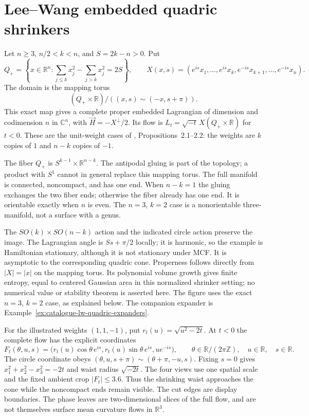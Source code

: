 \chapter{Lee--Wang embedded quadric shrinkers}\label{sec:catalogue-lw-quadric-shrinkers}
\begin{example}\label{ex:catalogue-lw-quadric-shrinkers}
Let $n\geq3$, $n/2<k<n$, and $S=2k-n>0$. Put
\[
 Q_+=\left\{x\in\mathbb R^n:\sum_{j\leq k}x_j^2-\sum_{j>k}x_j^2=2S\right\},\qquad
 X(x,s)=(e^{is}x_1,\ldots,e^{is}x_k,e^{-is}x_{k+1},\ldots,e^{-is}x_n).
\]
The domain is the mapping torus
\[
 (Q_+\times\mathbb R)/((x,s)\sim(-x,s+\pi)).
\]
This exact map gives a complete proper embedded Lagrangian of dimension and codimension $n$ in $\mathbb C^n$, with $\vec H=-X^\perp/2$. Its flow is $L_t=\sqrt{-t}\,X(Q_+\times\mathbb R)$ for $t<0$. These are the unit-weight cases of \cite{CatLeeWang2010}, Propositions~2.1--2.2: the weights are $k$ copies of $1$ and $n-k$ copies of $-1$.

The fiber $Q_+$ is $S^{k-1}\times\mathbb R^{n-k}$. The antipodal gluing is part of the topology; a product with $S^1$ cannot in general replace this mapping torus. The full manifold is connected, noncompact, and has one end. When $n-k=1$ the gluing exchanges the two fiber ends; otherwise the fiber already has one end. It is orientable exactly when $n$ is even. The $n=3$, $k=2$ case is a nonorientable three-manifold, not a surface with a genus.

The $SO(k)\times SO(n-k)$ action and the indicated circle action preserve the image. The Lagrangian angle is $Ss+\pi/2$ locally; it is harmonic, so the example is Hamiltonian stationary, although it is not stationary under MCF. It is asymptotic to the corresponding quadric cone. Properness follows directly from $|X|=|x|$ on the mapping torus. Its polynomial volume growth gives finite entropy, equal to centered Gaussian area in this normalized shrinker setting; no numerical value or stability theorem is asserted here. The figure uses the exact $n=3$, $k=2$ case, as explained below. The companion expander is Example~\ref{ex:catalogue-lw-quadric-expanders}.

For the illustrated weights $(1,1,-1)$, put $r_t(u)=\sqrt{u^2-2t}$. At $t<0$ the complete flow has the explicit coordinates
\[
 F_t(\theta,u,s)=\bigl(r_t(u)\cos\theta\,e^{is},
 r_t(u)\sin\theta\,e^{is},u e^{-is}\bigr),
 \qquad \theta\in\mathbb R/(2\pi\mathbb Z),\quad u\in\mathbb R,\quad s\in\mathbb R.
\]
The circle coordinate obeys $(\theta,u,s+\pi)\sim(\theta+\pi,-u,s)$.
Fixing $s=0$ gives $x_1^2+x_2^2-x_3^2=-2t$ and waist radius $\sqrt{-2t}$.
The four views use one spatial scale and the fixed ambient crop $|F_t|\leq3.6$.
Thus the shrinking waist approaches the cone while the noncompact ends remain visible.
The cut edges are display boundaries. The phase leaves are two-dimensional slices of the full flow, and are not themselves surface mean curvature flows in $\mathbb R^3$.


\end{example}

